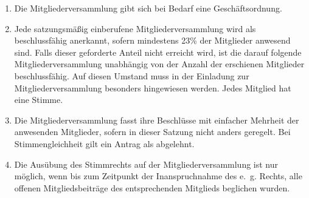 \documentclass[a4paper,12pt]{scrartcl}
\begin{document}
\begin{enumerate}
\begin{itemize}
    \end{itemize}
  \item Die Mitgliederversammlung gibt sich bei Bedarf eine Geschäftsordnung.
  \item Jede satzungsmäßig einberufene Mitgliederversammlung wird als
    beschlussfähig anerkannt, sofern mindestens 23\% der Mitglieder anwesend
    sind. Falls dieser geforderte Anteil nicht erreicht wird, ist die darauf
    folgende Mitgliederversammlung unabhängig von der Anzahl der erschienen
    Mitglieder beschlussfähig. Auf diesen Umstand muss in der Einladung zur
    Mitgliederversammlung besonders hingewiesen werden. Jedes Mitglied hat eine
    Stimme.
  \item Die Mitgliederversammlung fasst ihre Beschlüsse mit einfacher Mehrheit
    der anwesenden Mitglieder, sofern in dieser Satzung nicht anders geregelt.
    Bei Stimmengleichheit gilt ein Antrag als abgelehnt.
  \item Die Ausübung des Stimmrechts auf der Mitgliederversammlung ist nur 
    möglich, wenn bis zum Zeitpunkt der Inanspruchnahme des e.~g. Rechts, 
    alle offenen Mitgliedsbeiträge des entsprechenden Mitglieds beglichen
    wurden.
\end{enumerate}
\end{document}
